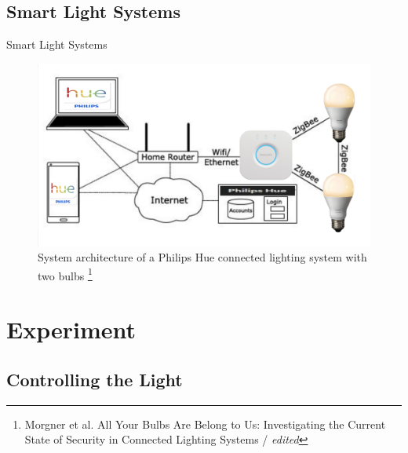 \documentclass[11pt,t,usepdftitle=false,aspectratio=169]{beamer}
\begin{document}
\subsection{Smart Light Systems} %
\label{sub:smart_lights}
\begin{frame}{Smart Light Systems} %
  \begin{figure}
  	\centering
  	\includegraphics{img/smart-light-system.png} 
  	\caption{\small{System architecture of a Philips Hue connected lighting system with two bulbs} \footnote{\tiny{Morgner et al. All Your Bulbs Are Belong to Us: Investigating the Current State of Security in Connected Lighting Systems / \textit{edited}}}}
  \end{figure}
\end{frame}


\section{Experiment}%
\label{sec:experiment}

\subsection{Controlling the Light} %
\label{sub:controlling_the_lights}
\end{document}
